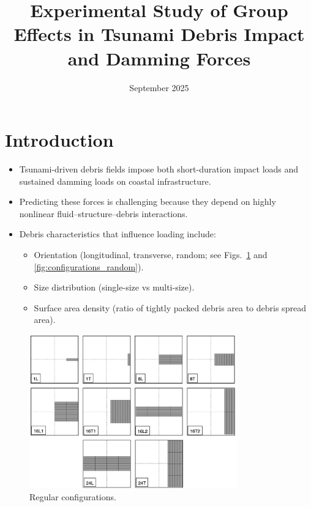 \documentclass{article}
\title{Experimental Study of Group Effects in Tsunami Debris Impact and Damming Forces}
\date{September 2025}
\begin{document}
\maketitle

\section{Introduction}
\begin{itemize}
    \item Tsunami-driven debris fields impose both short-duration impact loads and sustained damming loads on coastal infrastructure.
    \item Predicting these forces is challenging because they depend on highly nonlinear fluid--structure--debris interactions.
    \item Debris characteristics that influence loading include:
    \begin{itemize}
        \item Orientation (longitudinal, transverse, random; see Figs.~\ref{fig:configurations} and \ref{fig:configurations_random}).
        \item Size distribution (single-size vs multi-size).
        \item Surface area density (ratio of tightly packed debris area to debris spread area).
    \end{itemize}

\end{itemize}

\begin{figure}[htbp]
    \centering
    \includegraphics[width=0.8\textwidth]{Configurations.jpg}
    \caption{Regular configurations.}
    \label{fig:configurations}
\end{figure}
\end{document}
